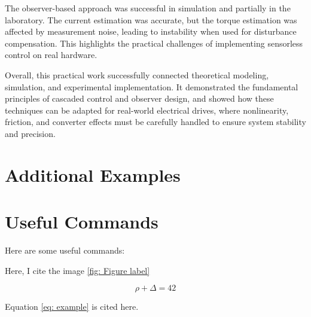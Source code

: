 \documentclass{rapportCS}
\begin{document}
The observer-based approach was successful in simulation and partially in the laboratory. 
The current estimation was accurate, but the torque estimation was affected by measurement noise, leading to instability when used for disturbance compensation. 
This highlights the practical challenges of implementing sensorless control on real hardware.

Overall, this practical work successfully connected theoretical modeling, simulation, and experimental implementation. 
It demonstrated the fundamental principles of cascaded control and observer design, and showed how these techniques can be adapted for real-world electrical drives, where nonlinearity, friction, and converter effects must be carefully handled to ensure system stability and precision.






\newpage

\section{Additional Examples}




\section{Useful Commands}

Here are some useful commands:



Here, I cite the image \ref{fig: Figure label}



\begin{equation} \label{eq: example}
\rho + \Delta = 42
\end{equation}

Equation \ref{eq: example} is cited here. 
\end{document}
